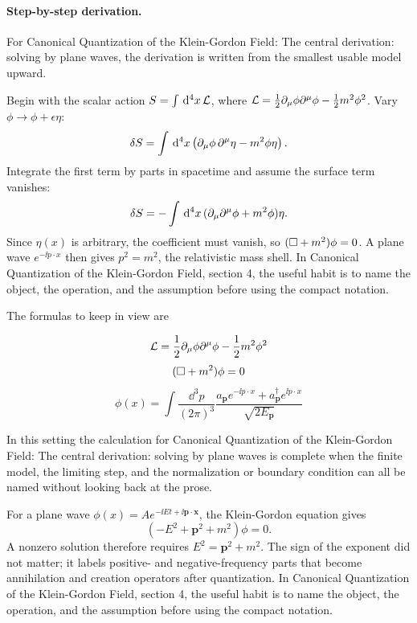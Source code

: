\paragraph{Step-by-step derivation.}

For Canonical Quantization of the Klein-Gordon Field: The central derivation: solving by plane waves, the derivation is written from the smallest usable model upward.

Begin with the scalar action \(S=\int\,\mathrm d^4x\,\mathcal L\), where \(\mathcal L=\frac12\partial_\mu\phi\partial^\mu\phi-\frac12m^2\phi^2\).  Vary \(\phi\to\phi+\epsilon\eta\):
\[
  \delta S=\int\,\mathrm d^4x\left(\partial_\mu\phi\,\partial^\mu\eta-m^2\phi\eta\right).
\]
Integrate the first term by parts in spacetime and assume the surface term vanishes:
\[
  \delta S=-\int\,\mathrm d^4x\,(\partial_\mu\partial^\mu\phi+m^2\phi)\eta.
\]
Since \(\eta(x)\) is arbitrary, the coefficient must vanish, so \((\Box+m^2)\phi=0\).  A plane wave \(e^{-\ii p\cdot x}\) then gives \(p^2=m^2\), the relativistic mass shell.  In Canonical Quantization of the Klein-Gordon Field, section 4, the useful habit is to name the object, the operation, and the assumption before using the compact notation.

The formulas to keep in view are

\[
  \mathcal L=\frac12\partial_\mu\phi\partial^\mu\phi-\frac12m^2\phi^2
\]
\[
  (\Box+m^2)\phi=0
\]
\[
  \phi(x)=\int\frac{\dd^3p}{(2\pi)^3}\frac{a_{\bm p}e^{-\ii p\cdot x}+a_{\bm p}^\dagger e^{\ii p\cdot x}}{\sqrt{2E_{\bm p}}}
\]

In this setting the calculation for Canonical Quantization of the Klein-Gordon Field: The central derivation: solving by plane waves is complete when the finite model, the limiting step, and the normalization or boundary condition can all be named without looking back at the prose.




\begin{example}
For a plane wave \(\phi(x)=Ae^{-\ii Et+\ii\bm p\cdot\bm x}\), the Klein-Gordon equation gives
\[
  (-E^2+\bm p^2+m^2)\phi=0.
\]
A nonzero solution therefore requires \(E^2=\bm p^2+m^2\).  The sign of the exponent did not matter; it labels positive- and negative-frequency parts that become annihilation and creation operators after quantization.  In Canonical Quantization of the Klein-Gordon Field, section 4, the useful habit is to name the object, the operation, and the assumption before using the compact notation.
\end{example}



